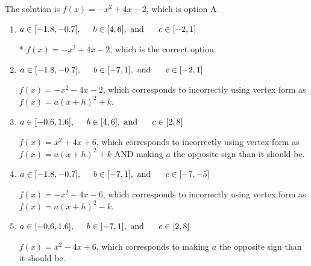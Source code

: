 \documentclass{extbook}[14pt]
\begin{document}
\begin{enumerate}
{The solution is \( f(x) = -x^{2} +4 x -2 \), which is option A.\begin{enumerate}[label=\Alph*.]
\item \( a \in [-1.8, -0.7], \hspace*{5mm} b \in [4, 6], \text{ and } \hspace*{5mm} c \in [-2, 1] \)

* $f(x)=-x^{2} +4 x -2$, which is the correct option.
\item \( a \in [-1.8, -0.7], \hspace*{5mm} b \in [-7, 1], \text{ and } \hspace*{5mm} c \in [-2, 1] \)

$f(x)=-x^{2} -4 x -2$, which corresponds to incorrectly using vertex form as $f(x) = a(x+h)^2+k$.
\item \( a \in [-0.6, 1.6], \hspace*{5mm} b \in [4, 6], \text{ and } \hspace*{5mm} c \in [2, 8] \)

$f(x)=x^{2} +4 x + 6$, which corresponds to incorrectly using vertex form as $f(x) = a(x+h)^2+k$ AND making $a$ the opposite sign than it should be.
\item \( a \in [-1.8, -0.7], \hspace*{5mm} b \in [-7, 1], \text{ and } \hspace*{5mm} c \in [-7, -5] \)

$f(x)=-x^{2} -4 x -6$, which corresponds to incorrectly using vertex form as $f(x) = a(x+h)^2 - k$.
\item \( a \in [-0.6, 1.6], \hspace*{5mm} b \in [-7, 1], \text{ and } \hspace*{5mm} c \in [2, 8] \)

$f(x)=x^{2} -4 x + 6$, which corresponds to making $a$ the opposite sign than it should be.
\end{enumerate}

}
\end{enumerate}
\end{document}
